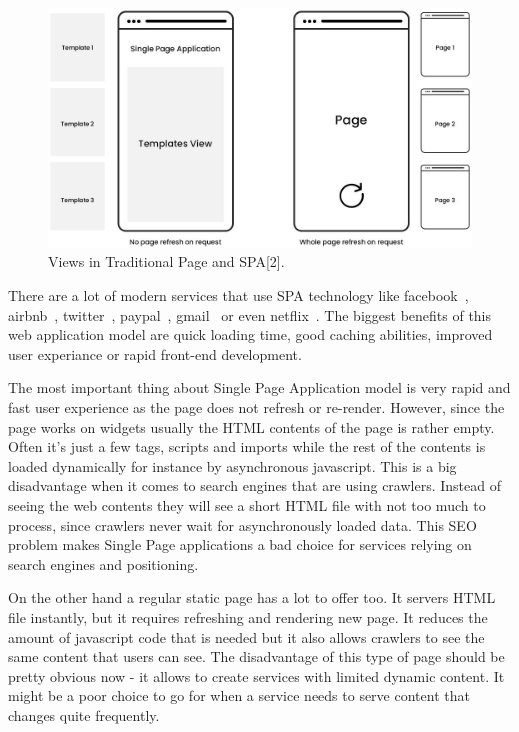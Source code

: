 \documentclass[a4paper,12pt]{book}
\begin{document}
{{\begin{figure}[h!]
\centering
\includegraphics[width=1.0\textwidth]{spa-template}
\caption{Views in Traditional Page and SPA[2].}
\end{figure} 

\bigskip
There are a lot of modern services that use SPA technology like facebook~\cite{facebook}, airbnb~\cite{airbnb}, twitter~\cite{twitter}, paypal~\cite{paypal}, gmail~\cite{gmail} or even netflix~\cite{netflix}. The biggest benefits of this web application model are quick loading time, good caching abilities, improved user experiance or rapid front-end development. 

\bigskip
The most important thing about Single Page Application model is very rapid and fast user experience as the page does not refresh or re-render. However, since the page works on widgets usually the HTML contents of the page is rather empty. Often it's just a few tags, scripts and imports while the rest of the contents is loaded dynamically for instance by asynchronous javascript. This is a big disadvantage when it comes to search engines that are using crawlers. Instead of seeing the web contents they will see a short HTML file with not too much to process, since crawlers never wait for asynchronously loaded data. This SEO problem makes Single Page applications a bad choice for services relying on search engines and positioning.

\bigskip
On the other hand a regular static page has a lot to offer too. It servers HTML file instantly, but it requires refreshing and rendering new page. It reduces the amount of javascript code that is needed but it also allows crawlers to see the same content that users can see. The disadvantage of this type of page should be pretty obvious now - it allows to create services with limited dynamic content. It might be a poor choice to go for when a service needs to serve content that changes quite frequently.


}}
\end{document}
